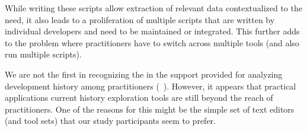 While writing these scripts allow extraction of relevant data contextualized to the need, it also leads to a proliferation of multiple scripts that are written by individual developers and need to be maintained or integrated. This further adds to the problem where practitioners have to switch across multiple tools (and also run multiple scripts).

We are not the first in recognizing the in the support provided for analyzing development history among practitioners (~\cite{sun2015informationhistory, guo2016cold-start, yan2014miningcontracts}). However, it appears that practical applications current history exploration tools are still beyond the reach of practitioners. One of the reasons for this might be the simple set of text editors (and tool sets) that our study participants seem to prefer.

